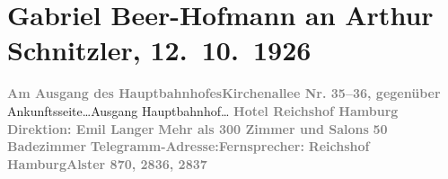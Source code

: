 

         
         \renewcommand{\erwaehntePersonen}{Personen: Gabriel Beer-Hofmann, Richard Beer-Hofmann, Anton-Emil Langer, Lili Schnitzler}
         \renewcommand{\erwaehnteOrte}{Orte: Berlin, Hamburg, Hauptbahnhof, Hotel Reichshof, Kirchenallee, New York City, Venedig, Wien}
         \renewcommand{\erwaehnteWerke}{}
               \section[Gabriel Beer-Hofmann an Arthur Schnitzler, 12. 10. 1926]{ Gabriel Beer-Hofmann an Arthur Schnitzler, 12. 10. 1926}\nopagebreak{}\rehead{ }\begin{ledgroupsized}[t]{13cm}\normalsize\beginnumbering \toendnotes[C]{\smallbreak\pagebreak[2]} 
\pstart
           \noindent{}\textcolor{gray}{\textbf{{\pb}Am Ausgang des Hauptbahnhofes}}\hfill \textcolor{gray}{\textbf{Kirchenallee Nr. 35–36, gegenüber}}\pend
           \pstart
           {\dotssix}Ankunftsseite{\dotssix}\hfill {\dots}Ausgang Hauptbahnhof{\dots}\pend
           \pstart
           \centering{}\textcolor{gray}{\textbf{Hotel Reichshof Hamburg}}\pend
           \pstart
           \noindent{}\centering{}\textcolor{gray}{\textbf{Direktion: Emil Langer}}\pend
           \pstart
           \noindent{}\centering{}\textcolor{gray}{\textbf{Mehr als 300 Zimmer und Salons}}\pend
           \pstart
           \noindent{}\centering{}\textcolor{gray}{\textbf{50 Badezimmer}}\pend
           \pstart
           \noindent{}\textcolor{gray}{\textbf{Telegramm-Adresse:}}\hfill \textcolor{gray}{\textbf{Fernsprecher:}}\pend
           \pstart
           \textcolor{gray}{\textbf{Reichshof Hamburg}}\hfill \textcolor{gray}{\textbf{Alster 870, 2836, 2837}}\pend

\end{ledgroupsized}
